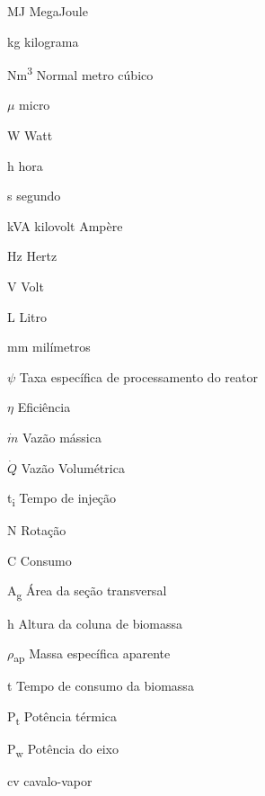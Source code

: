 \begin{simbolos}
	\item[MJ] MegaJoule
	\item[kg] kilograma
	\item[Nm\textsuperscript{3}] Normal metro cúbico
 	\item[$\mu$] micro
	\item[W] Watt
	\item[h] hora
	\item[s] segundo
	\item[kVA] kilovolt Ampère
	\item[Hz] Hertz
	\item[V] Volt
	\item[L] Litro
	\item[mm] milímetros
	\item[$\psi$] Taxa específica de processamento do reator
	\item[$\eta$] Eficiência
	\item[$\dot{m}$] Vazão mássica
	\item[$\dot{Q}$] Vazão Volumétrica
	\item[t\textsubscript{i}] Tempo de injeção
	\item[N] Rotação
	\item[C] Consumo
	\item[A\textsubscript{g}] Área da seção transversal
	\item[h] Altura da coluna de biomassa
	\item[$\rho$\textsubscript{ap}]	Massa específica aparente
	\item[t] Tempo de consumo da biomassa
	\item[P\textsubscript{t}] Potência térmica
	\item[P\textsubscript{w}] Potência do eixo
	\item[cv] cavalo-vapor


\end{simbolos}
